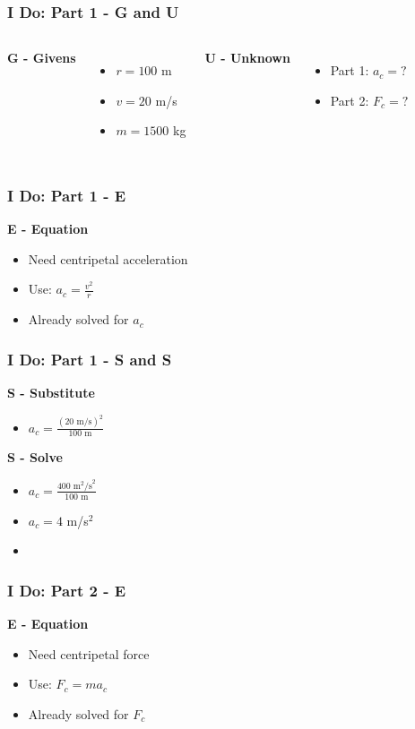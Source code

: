 \documentclass{beamer}
\begin{document}
\begin{frame}
\frametitle{I Do: Part 1 - G and U}
\begin{columns}[T]
\textbf{G - Givens}
\begin{itemize}
    \item $r = 100$ m
    \item $v = 20$ m/s
    \item $m = 1500$ kg
\end{itemize}

\textbf{U - Unknown}
\begin{itemize}
    \item Part 1: $a_c = ?$
    \item Part 2: $F_c = ?$
\end{itemize}
\end{columns}
\end{frame}

\begin{frame}
\frametitle{I Do: Part 1 - E}
\textbf{E - Equation}
\begin{itemize}
    \item Need centripetal acceleration
    \item Use: $a_c = \frac{v^2}{r}$
    \item Already solved for $a_c$
\end{itemize}
\end{frame}

\begin{frame}
\frametitle{I Do: Part 1 - S and S}
\textbf{S - Substitute}
\begin{itemize}
    \item $a_c = \frac{(20 \text{ m/s})^2}{100 \text{ m}}$
\end{itemize}

\textbf{S - Solve}
\begin{itemize}
    \item $a_c = \frac{400 \text{ m}^2\text{/s}^2}{100 \text{ m}}$
    \item $a_c = 4$ m/s$^2$
    \item {}
\end{itemize}
\end{frame}

\begin{frame}
\frametitle{I Do: Part 2 - E}
\textbf{E - Equation}
\begin{itemize}
    \item Need centripetal force
    \item Use: $F_c = ma_c$
    \item Already solved for $F_c$
\end{itemize}
\end{frame}
\end{document}
